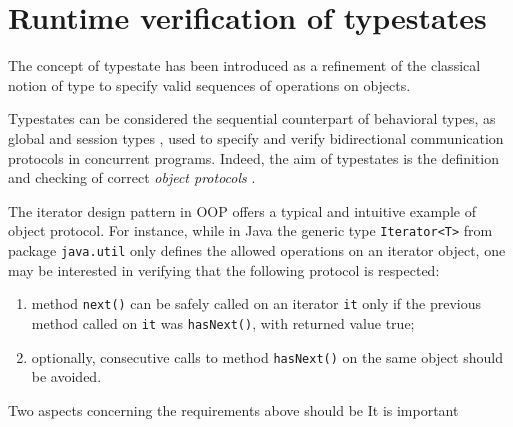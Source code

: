 \section{Runtime verification of typestates}\label{typestates}

The concept of typestate \cite{StromYemini86} has been introduced as a refinement of the classical notion of type to specify valid sequences of operations on objects.

Typestates can be considered the sequential counterpart of behavioral types, as global \cite{CarboneHY07} and session types \cite{Honda93}, used to specify and verify bidirectional communication protocols
in concurrent programs. Indeed, the aim of typestates is the definition and checking of correct \emph{object protocols} \cite{BacchianiBGMR22}.

The iterator design pattern in OOP offers a typical and intuitive example of object protocol. For instance, while in Java the generic type \lstinline{Iterator<T>} from package \lstinline|java.util| only defines the allowed operations on an iterator object, one may be interested in verifying that the following protocol is respected:
\begin{enumerate}
 \item method \lstinline|next()| can be safely called on an iterator \lstinline|it| only if the previous method called on \lstinline{it} was \lstinline|hasNext()|, with returned value true;
 \item optionally, consecutive calls to method \lstinline|hasNext()| on the same object should be avoided.
\end{enumerate}

Two aspects concerning the requirements above should be   It is important